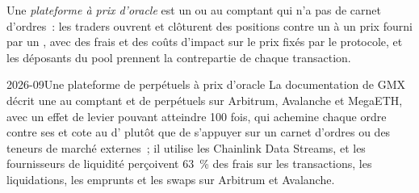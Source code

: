 \begin{definition}\label{def:m3:on-chain-order-books-and-perpetual-dexs:oracle}
Une \emph{plateforme à prix d'oracle} est un  ou au comptant qui n'a pas de carnet d'ordres~: les traders ouvrent et clôturent des positions
contre un  à un prix fourni par un , avec des frais et des coûts d'impact sur le prix fixés par le protocole, et les déposants du pool prennent la
contrepartie de chaque transaction.
\end{definition}

\begin{dated}{2026-09}{Une plateforme de perpétuels à prix d'oracle}\label{dat:m3:on-chain-order-books-and-perpetual-dexs:gmx}
La documentation de GMX décrit une  au comptant et de perpétuels sur Arbitrum, Avalanche et MegaETH, avec un effet de levier pouvant atteindre 100 fois, qui achemine
chaque ordre contre ses  et cote au  d' plutôt que de s'appuyer sur un carnet d'ordres ou des teneurs de marché externes~; il utilise
les  Chainlink Data Streams, et les fournisseurs de liquidité perçoivent 63~\% des frais sur les transactions, les liquidations, les emprunts et les swaps sur Arbitrum et Avalanche.
\end{dated}

